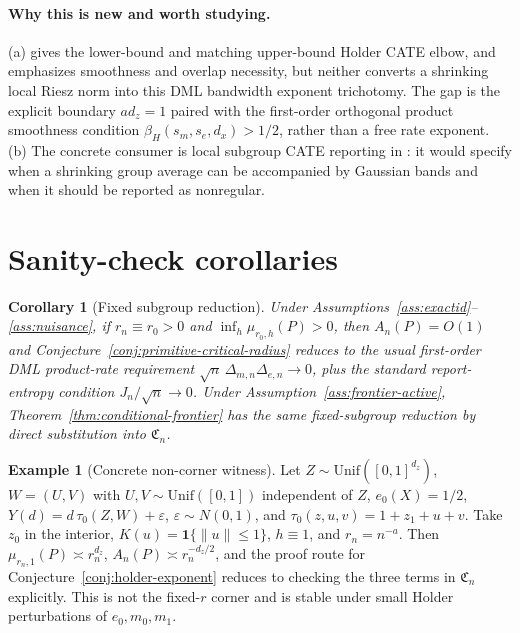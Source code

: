 \documentclass[11pt]{article}
\newcommand{\one}{\mathbf{1}}
\theoremstyle{definition}
\newtheorem{example}{Example}
\theoremstyle{plain}
\newtheorem{corollary}{Corollary}
\theoremstyle{remark}
\begin{document}
\paragraph{Why this is new and worth studying.}
(a) \citet[Theorem~1, Section~3.3, and Theorem~2]{KennedyBalakrishnanRobinsWasserman2024MinimaxCATE}
gives the lower-bound and matching upper-bound Holder CATE elbow, and
\citet[abstract and Sections~2--3]{ArmstrongKolesar2021FiniteSampleATE}
emphasizes smoothness and overlap necessity, but neither converts a shrinking
local Riesz norm into this DML bandwidth exponent trichotomy.  The gap is the
explicit boundary \(a d_z=1\) paired with the first-order orthogonal product
smoothness condition \(\beta_H(s_m,s_e,d_x)>1/2\), rather than a free
rate exponent.  (b) The concrete consumer is local subgroup CATE reporting in
\citet{SemenovaChernozhukov2021DMLCATE}: it would specify when a shrinking
group average can be accompanied by Gaussian bands and when it should be
reported as nonregular.

\section{Sanity-check corollaries}
\label{sec:witness}
\begin{corollary}[Fixed subgroup reduction]\label{cor:fixed}
Under Assumptions~\ref{ass:exactid}--\ref{ass:nuisance}, if \(r_n\equiv r_0>0\)
and \(\inf_h\mu_{r_0,h}(P)>0\), then \(A_n(P)=O(1)\) and
Conjecture~\ref{conj:primitive-critical-radius} reduces to the usual
first-order DML product-rate requirement
\(\sqrt n\,\Delta_{m,n}\Delta_{e,n}\to0\), plus the standard report-entropy
condition \(J_n/\sqrt n\to0\).  Under
Assumption~\ref{ass:frontier-active}, Theorem~\ref{thm:conditional-frontier}
has the same fixed-subgroup reduction by direct substitution into
\(\mathfrak C_n\).
\end{corollary}

\begin{example}[Concrete non-corner witness]\label{ex:witness}
Let \(Z\sim\mathrm{Unif}([0,1]^{d_z})\), \(W=(U,V)\) with
\(U,V\sim\mathrm{Unif}([0,1])\) independent of \(Z\), \(e_0(X)=1/2\),
\(Y(d)=d\,\tau_0(Z,W)+\varepsilon\), \(\varepsilon\sim N(0,1)\), and
\(\tau_0(z,u,v)=1+z_1+u+v\).  Take \(z_0\) in the
interior, \(K(u)=\one\{\|u\|\le1\}\), \(h\equiv1\), and \(r_n=n^{-a}\).  Then
\(\mu_{r_n,1}(P)\asymp r_n^{d_z}\), \(A_n(P)\asymp r_n^{-d_z/2}\), and the
proof route for Conjecture~\ref{conj:holder-exponent} reduces to checking the
three terms in \(\mathfrak C_n\) explicitly.  This is not the fixed-\(r\)
corner and is stable under small Holder perturbations of \(e_0,m_0,m_1\).
\end{example}
\end{document}
